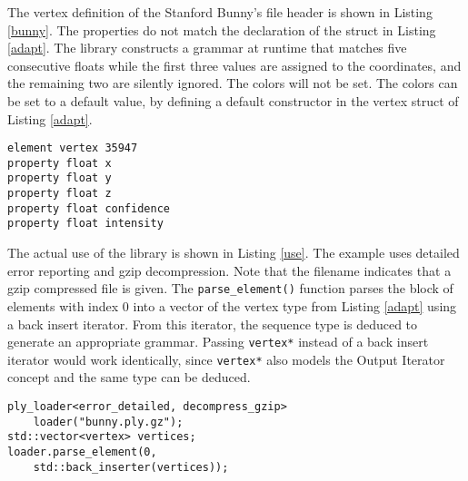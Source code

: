 The vertex definition of the Stanford Bunny's file header is shown in Listing
\ref{bunny}. The properties do not match the declaration of the struct in
Listing \ref{adapt}. The library constructs a grammar at runtime that matches
five consecutive floats while the first three values are assigned to the
coordinates, and the remaining two are silently ignored. The colors will not be
set. The colors can be set to a default value, by defining a default constructor
in the vertex struct of Listing \ref{adapt}.

\begin{lstlisting}[label=bunny, frame=tb,
  caption=Stanford Bunny's definition of the vertex element]
element vertex 35947
property float x
property float y
property float z
property float confidence
property float intensity
\end{lstlisting}

The actual use of the library is shown in Listing \ref{use}. The example uses
detailed error reporting and gzip decompression. Note that the filename
indicates that a gzip compressed file is given. The \texttt{parse\_element()}
function parses the block of elements with index 0 into a vector of the vertex
type from Listing \ref{adapt} using a back insert iterator. From this iterator,
the sequence type is deduced to generate an appropriate grammar. Passing
\texttt{vertex*} instead of a back insert iterator would work identically, since
\texttt{vertex*} also models the Output Iterator concept and the same type can
be deduced.

\begin{lstlisting}[label=use, frame=tb, caption=Example use of the library]
ply_loader<error_detailed, decompress_gzip>
	loader("bunny.ply.gz");
std::vector<vertex> vertices;
loader.parse_element(0,
	std::back_inserter(vertices));
\end{lstlisting}

